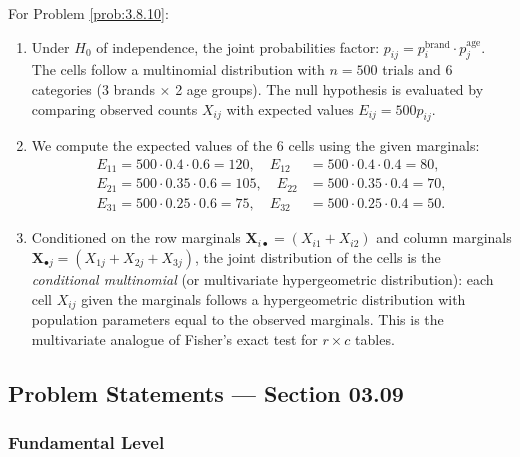 \begin{solucion}
	\label{sol:3.8.10}
	For Problem \ref{prob:3.8.10}:
	\begin{enumerate}
		\item Under $H_{0}$ of independence, the joint probabilities factor: $p_{ij} = p_{i}^{\text{brand}} \cdot p_{j}^{\text{age}}$. The cells follow a multinomial distribution with $n = 500$ trials and $6$ categories (3 brands $\times$ 2 age groups). The null hypothesis is evaluated by comparing observed counts $X_{ij}$ with expected values $E_{ij} = 500 p_{ij}$.
		\item We compute the expected values of the 6 cells using the given marginals:
		\begin{align*}
			E_{11} = 500 \cdot 0.4 \cdot 0.6 = 120, \quad E_{12} &= 500 \cdot 0.4 \cdot 0.4 = 80, \\
			E_{21} = 500 \cdot 0.35 \cdot 0.6 = 105, \quad E_{22} &= 500 \cdot 0.35 \cdot 0.4 = 70, \\
			E_{31} = 500 \cdot 0.25 \cdot 0.6 = 75, \quad E_{32} &= 500 \cdot 0.25 \cdot 0.4 = 50.
		\end{align*}
		\item Conditioned on the row marginals $\bm{X}_{i \bullet} = (X_{i1} + X_{i2})$ and column marginals $\bm{X}_{\bullet j} = (X_{1j} + X_{2j} + X_{3j})$, the joint distribution of the cells is the \emph{conditional multinomial} (or multivariate hypergeometric distribution): each cell $X_{ij}$ given the marginals follows a hypergeometric distribution with population parameters equal to the observed marginals. This is the multivariate analogue of Fisher's exact test for $r \times c$ tables. \qedhere
	\end{enumerate}
\end{solucion}


\subsection*{Problem Statements --- Section 03.09}

\subsubsection*{Fundamental Level}

